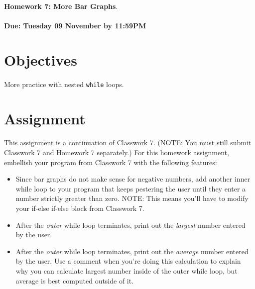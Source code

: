 \documentclass[letter,11pt]{article}
\begin{document}
\huge
\textbf{Homework 7: More Bar Graphs}.
\normalsize
\\ ~~ \\
\textbf{Due: Tuesday 09 November by 11:59PM}

\section*{Objectives}
\paragraph{}More practice with nested \texttt{while} loops.

\section*{Assignment}
\paragraph{}This assignment is a continuation of Classwork 7. (NOTE: You must still submit Classwork 7 and Homework 7 separately.) For this homework assignment, embellish your program from Classwork 7 with the following features:
\begin{itemize}
    \item Since bar graphs do not make sense for negative numbers, add another inner while loop to your program that keeps pestering the user until they enter a number strictly greater than zero. NOTE: This means you’ll have to modify your if-else if-else block from Classwork 7.
    \item After the \textit{outer} while loop terminates, print out the \textit{largest} number entered by the user.
    \item After the \textit{outer} while loop terminates, print out the \textit{average} number entered by the user. Use a comment when you're doing this calculation to explain why you can calculate largest number inside of the outer while loop, but average is best computed outside of it.
\end{itemize}
\end{document}
